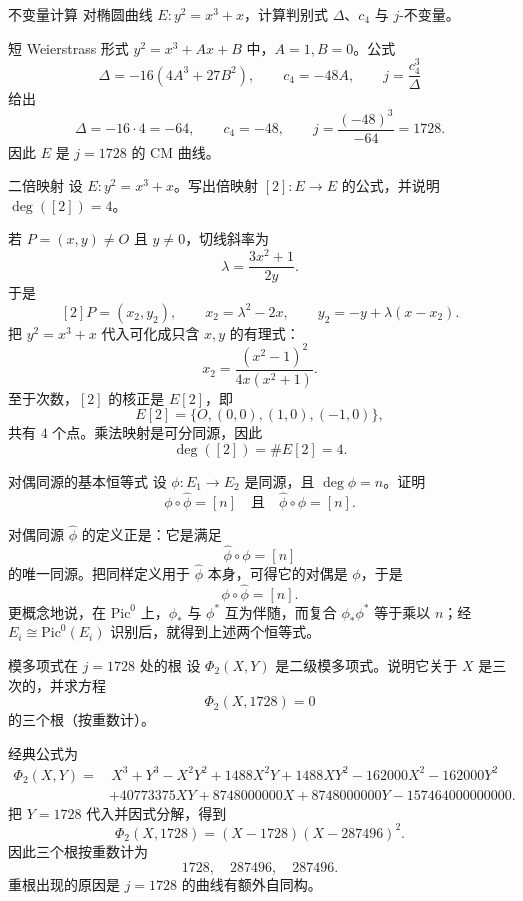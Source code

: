 \begin{problem}{不变量计算 \easy}
对椭圆曲线 $E: y^2=x^3+x$，计算判别式 $\Delta$、$c_4$ 与 $j$-不变量。
\end{problem}
\begin{solution}
短 Weierstrass 形式 $y^2=x^3+Ax+B$ 中，$A=1,B=0$。公式
\[
\Delta=-16(4A^3+27B^2),\qquad c_4=-48A,
\qquad j=\frac{c_4^3}{\Delta}
\]
给出
\[
\Delta=-16\cdot 4=-64,
\qquad c_4=-48,
\qquad j=\frac{(-48)^3}{-64}=1728.
\]
因此 $E$ 是 $j=1728$ 的 CM 曲线。
\end{solution}

\begin{problem}{二倍映射 \easy}
设 $E: y^2=x^3+x$。写出倍映射 $[2]:E\to E$ 的公式，并说明 $\deg([2])=4$。
\end{problem}
\begin{solution}
若 $P=(x,y)\neq O$ 且 $y\neq 0$，切线斜率为
\[
\lambda=\frac{3x^2+1}{2y}.
\]
于是
\[
[2]P=(x_2,y_2),\qquad x_2=\lambda^2-2x,
\qquad y_2=-y+\lambda(x-x_2).
\]
把 $y^2=x^3+x$ 代入可化成只含 $x,y$ 的有理式：
\[
x_2=\frac{(x^2-1)^2}{4x(x^2+1)}.
\]
至于次数，$[2]$ 的核正是 $E[2]$，即
\[
E[2]=\{O,(0,0),(1,0),(-1,0)\},
\]
共有 $4$ 个点。乘法映射是可分同源，因此
\[
\deg([2])=\#E[2]=4.
\]
\end{solution}

\begin{problem}{对偶同源的基本恒等式 \easy}
设 $\phi:E_1\to E_2$ 是同源，且 $\deg\phi=n$。证明
\[
\phi\circ\hat\phi=[n]
\quad\text{且}\quad
\hat\phi\circ\phi=[n].
\]
\end{problem}
\begin{solution}
对偶同源 $\hat\phi$ 的定义正是：它是满足
\[
\hat\phi\circ\phi=[n]
\]
的唯一同源。把同样定义用于 $\hat\phi$ 本身，可得它的对偶是 $\phi$，于是
\[
\phi\circ\hat\phi=[n].
\]
更概念地说，在 $\mathrm{Pic}^0$ 上，$\phi_*$ 与 $\phi^*$ 互为伴随，而复合 $\phi_\ast\phi^*$ 等于乘以 $n$；经
$E_i\cong \mathrm{Pic}^0(E_i)$ 识别后，就得到上述两个恒等式。
\end{solution}

\begin{problem}{模多项式在 $j=1728$ 处的根 \easy}
设 $\Phi_2(X,Y)$ 是二级模多项式。说明它关于 $X$ 是三次的，并求方程
\[
\Phi_2(X,1728)=0
\]
的三个根（按重数计）。
\end{problem}
\begin{solution}
经典公式为
\begin{align*}
\Phi_2(X,Y)=&\,X^3+Y^3-X^2Y^2+1488X^2Y+1488XY^2-162000X^2-162000Y^2\\
&+40773375XY+8748000000X+8748000000Y-157464000000000.
\end{align*}
把 $Y=1728$ 代入并因式分解，得到
\[
\Phi_2(X,1728)=(X-1728)(X-287496)^2.
\]
因此三个根按重数计为
\[
1728,\quad 287496,\quad 287496.
\]
重根出现的原因是 $j=1728$ 的曲线有额外自同构。
\end{solution}

